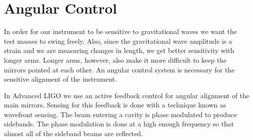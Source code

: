 

\section{Angular Control}

In order for our instrument to be sensitive to gravitational waves we want
the test masses to swing freely.
Also, since the gravitational wave amplitude is a strain and we are measuring
changes in length, we get better sensitivity with longer arms.
Longer arms, however, also make it more difficult to keep the mirrors pointed
at each other.
An angular control system is necessary for the sensitive alignment of the
instrument.

In Advanced LIGO we use an active feedback control for angular alignment of
the main mirrors\cite{aligowfs}.
Sensing for this feedback is done with a technique known as wavefront sensing.
The beam entering a cavity is phase modulated to produce sidebands.
The phase modulation is done at a high enough frequency so that almost all
of the sideband beams are reflected.

